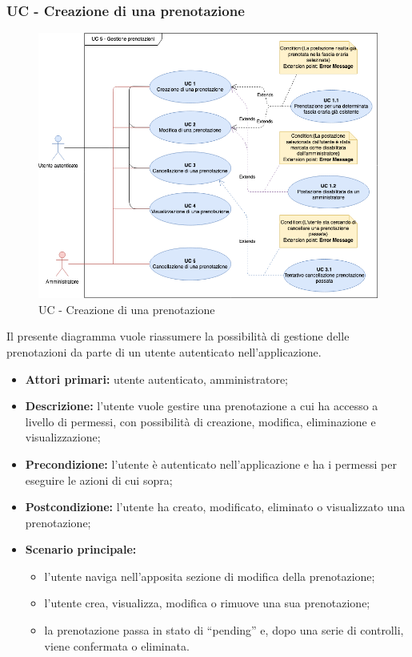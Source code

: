 \subsubsection{UC - Creazione di una prenotazione}

\begin{figure}[h]
  \centering
    \includegraphics[scale=0.5]{src/CasiDUso/Immagini/UC5.png}
  \caption{UC  - Creazione di una prenotazione}
\end{figure}

Il presente diagramma vuole riassumere la possibilità di gestione delle prenotazioni da parte di un utente autenticato nell’applicazione.

\begin{itemize}
\item \textbf{Attori primari:} utente autenticato, amministratore;
\item \textbf{Descrizione:} l’utente vuole gestire una prenotazione a cui ha accesso a livello di permessi, con possibilità di creazione, modifica, eliminazione e visualizzazione;
\item \textbf{Precondizione:} l’utente è autenticato nell’applicazione e ha i permessi per eseguire le azioni di cui sopra;
\item \textbf{Postcondizione:} l’utente ha creato, modificato, eliminato o visualizzato una prenotazione;
\item \textbf{Scenario principale:} 
	\begin{itemize}
		\item l’utente naviga nell’apposita sezione di modifica della prenotazione;
		\item l’utente crea, visualizza, modifica o rimuove una sua prenotazione;
		\item la prenotazione passa in stato di “pending” e, dopo una serie di controlli, viene confermata o eliminata.
	\end{itemize}
\end{itemize}

